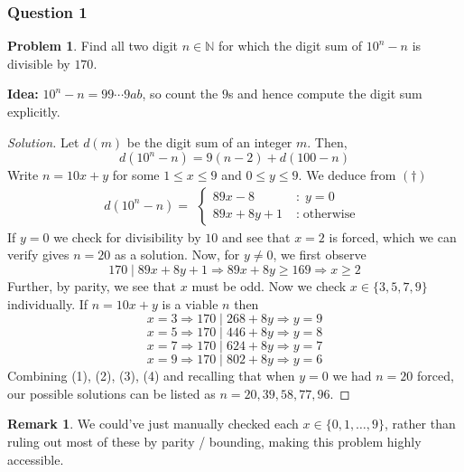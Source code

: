 \documentclass[11pt]{article}
\theoremstyle{definition}
\newtheorem*{problem}{Problem}
\newtheorem*{remark}{Remark}
\begin{document}
\subsubsection{Question 1}

\begin{problem}
    Find all two digit $n \in \mathbb{N}$ for which the digit sum of $10^n - n$ is divisible by $170$. 
\end{problem}

{\bf Idea:} $10^n - n = 99\cdots 9ab$, so count the $9$s and hence compute the digit sum explicitly. 

\begin{proof}[Solution]
    Let $d(m)$ be the digit sum of an integer $m$. Then, 
    \[d(10^n - n) = 9(n-2) + d(100 - n) \tag{$\dagger$}\]
    Write $n = 10x + y$ for some $1 \leq x \leq 9$ and $0 \leq y \leq 9$. We deduce from $(\dagger)$
    \[d(10^n - n) = \begin{aligned}\begin{cases}89x - 8 \; &: \; y = 0 \\ 
    89x + 8y + 1  \; &: \; \text{otherwise}\end{cases}\end{aligned}\]
    If $y = 0$ we check for divisibility by $10$ and see that $x = 2$ is forced, which we can verify gives $n=20$ as 
    a solution. Now, for $y \neq 0$, we first observe 
    \[170 \; {\Big |} \; 89x + 8y +1 \Longrightarrow 89x + 8y \geq 169 \Longrightarrow x \geq 2\]
    Further, by parity, we see that $x$ must be odd. Now we check $x \in \{3, 5, 7, 9\}$ individually. If 
    $n = 10x + y$ is a viable $n$ then
    \[x = 3 \Longrightarrow 170  \; {\Big |} \; 268 + 8y \Longrightarrow y = 9 \tag{1}\]
    \[x = 5 \Longrightarrow 170 \; {\Big |} \; 446 + 8y \Longrightarrow y = 8 \tag{2}\]
    \[x = 7 \Longrightarrow 170 \; {\Big |} \; 624 + 8y \Longrightarrow y = 7 \tag{3}\]
    \[x = 9 \Longrightarrow 170 \; {\Big |} \; 802 + 8y \Longrightarrow y = 6 \tag{4}\]
    Combining (1), (2), (3), (4) and recalling that when $y = 0$ we had $n=20$ forced, our possible solutions 
    can be listed as \underline{$n = 20, 39, 58, 77, 96$}.
\end{proof}

\begin{remark}
    We could've just manually checked each $x \in \{0, 1, \dots, 9\}$, rather than ruling out most of these by 
    parity / bounding, making this problem highly accessible. 
\end{remark}
\end{document}
